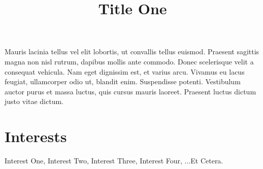 \documentclass[margin]{res}
\begin{document}
\begin{resume}
      \title{\textbf{Title One}}
      \begin{position}
        Mauris lacinia tellus vel elit lobortis, ut convallis tellus euismod. Praesent 
        sagittis magna non nisl rutrum, dapibus mollis ante commodo. Donec scelerisque 
        velit a consequat vehicula. Nam eget dignissim est, et varius arcu. Vivamus eu 
        lacus feugiat, ullamcorper odio ut, blandit enim. Suspendisse potenti. 
        Vestibulum auctor purus et massa luctus, quis cursus mauris laoreet. Praesent 
        luctus dictum justo vitae dictum.
      \end{position}

    \section{Interests}
      Interest One, Interest Two, Interest Three, Interest Four, ...Et Cetera.

  \end{resume}
\end{document}
